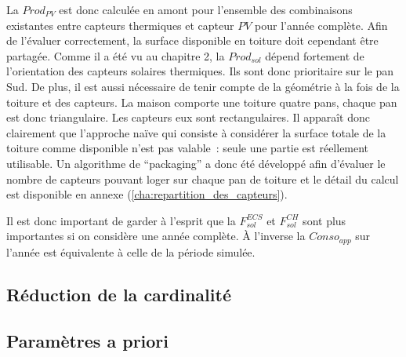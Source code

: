 La $Prod_{PV}$ est donc calculée en amont pour l’ensemble des combinaisons existantes entre
capteurs thermiques et capteur $PV$ pour l’année complète. Afin de l’évaluer correctement,
la surface disponible en toiture doit cependant être partagée. Comme il
a été vu au chapitre 2, la $Prod_{sol}$ dépend fortement de l’orientation des capteurs
solaires thermiques. Ils sont donc prioritaire sur le pan Sud. De plus, il est aussi
nécessaire de tenir compte de la géométrie à la fois de la toiture et des capteurs. La
maison comporte une toiture quatre pans, chaque pan est donc triangulaire. Les capteurs
eux sont rectangulaires. Il apparaît donc clairement que l’approche naïve qui consiste à
considérer la surface totale de la toiture comme disponible n’est pas valable~: seule une
partie est réellement utilisable. Un algorithme de \enquote{packaging} a donc été
développé afin d’évaluer le nombre de capteurs pouvant loger sur chaque pan de toiture et
le détail du calcul est disponible en annexe (\ref{cha:repartition_des_capteurs}).

Il est donc important de garder à l’esprit que la $F_{sol}^{ECS}$ et $F_{sol}^{CH}$
sont plus importantes si on considère une année complète. À l’inverse la $Conso_{app}$
sur l’année est équivalente à celle de la période simulée.





\subsection{Réduction de la cardinalité} %
\label{sec:reduction_de_la_cardinalite}
\subsection{Paramètres a priori} %
\label{sub:parametres_a_priori}
~


